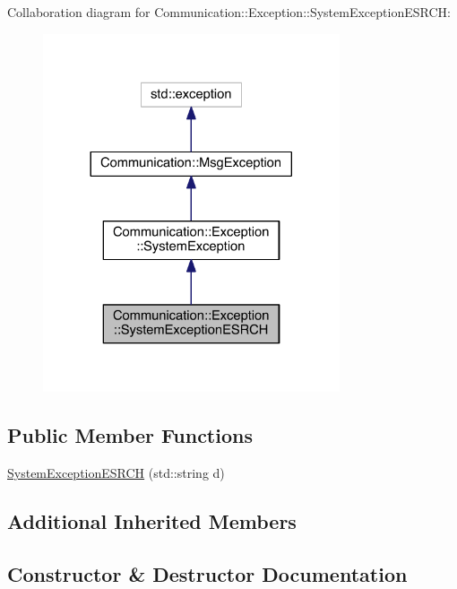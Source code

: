 Collaboration diagram for Communication\+:\+:Exception\+:\+:System\+Exception\+E\+S\+R\+C\+H\+:\nopagebreak
\begin{figure}[H]
\begin{center}
\leavevmode
\includegraphics[width=248pt]{class_communication_1_1_exception_1_1_system_exception_e_s_r_c_h__coll__graph}
\end{center}
\end{figure}
\subsection*{Public Member Functions}
\begin{DoxyCompactItemize}
\item 
\hyperlink{class_communication_1_1_exception_1_1_system_exception_e_s_r_c_h_ac52afb84cae19d300e6c44682fa40f06}{System\+Exception\+E\+S\+R\+C\+H} (std\+::string d)
\end{DoxyCompactItemize}
\subsection*{Additional Inherited Members}


\subsection{Constructor \& Destructor Documentation}
\hypertarget{class_communication_1_1_exception_1_1_system_exception_e_s_r_c_h_ac52afb84cae19d300e6c44682fa40f06}{}
